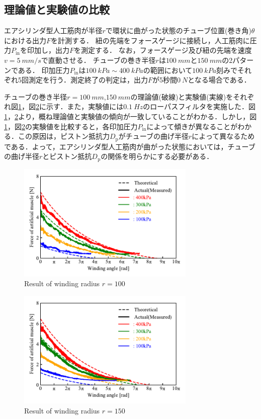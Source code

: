 \subsection{理論値と実験値の比較}%
エアシリンダ型人工筋肉が半径$r$で環状に曲がった状態のチューブ位置(巻き角)$\theta$における出力$F$を計測する．
紐の先端をフォースゲージに接続し，人工筋肉に圧力$P_\mathrm{in}$を印加し，出力$F$を測定する．
なお，フォースゲージ及び紐の先端を速度$v=\SI{5}{mm/s}$で直動させる．
チューブの巻き半径$r$は$\SI{100}{mm}$と$\SI{150}{mm}$の2パターンである．
印加圧力$P_\mathrm{in}$は$\SI{100}{kPa} \sim \SI{400}{kPa}$の範囲において$\SI{100}{kPa}$刻みでそれぞれ5回測定を行う．測定終了の判定は，出力$F$が5秒間$\SI{0}{N}$となる場合である．
\par
チューブの巻き半径$r=\SI{100}{mm}$,$\SI{150}{mm}$の理論値(破線)と実験値(実線)をそれぞれ図\ref{r=100mm}，図\ref{r=150mm}に示す．また，実験値には$\SI{0.1}{Hz}$のローパスフィルタを実施した．図\ref{r=100mm}，\ref{r=150mm}より，概ね理論値と実験値の傾向が一致していることがわかる．しかし，図\ref{r=100mm}，図\ref{r=150mm}の実験値を比較すると，各印加圧力$P_\mathrm{in}$によって傾きが異なることがわかる．この原因は，ピストン抵抗力$D_\mathrm{p}$がチューブの曲げ半径$r$によって異なるためである．よって，エアシリンダ型人工筋肉が曲がった状態においては，チューブの曲げ半径$r$とピストン抵抗$D_\mathrm{p}$の関係を明らかにする必要がある．
\begin{figure}[t]
  \centering
  \includegraphics[width=85mm]{_pdf/result_100mm.pdf}
  \caption{Result of winding radius $r=100$}
  \label{r=100mm}
\end{figure}

\begin{figure}[t]
  \centering
  \includegraphics[width=85mm]{_pdf/result_150mm.pdf}
  \caption{Result of winding radius $r=150$}
  \label{r=150mm}
\end{figure}

